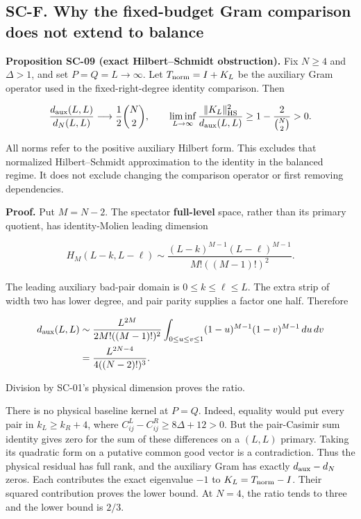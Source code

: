 \hypertarget{sc-f.-why-the-fixed-budget-gram-comparison-does-not-extend-to-balance}{%
\subsection{SC-F. Why the fixed-budget Gram comparison does not extend to balance}\label{sc-f.-why-the-fixed-budget-gram-comparison-does-not-extend-to-balance}}

\textbf{Proposition SC-09 (exact Hilbert--Schmidt obstruction).} Fix \(N\geq4\) and \(\Delta>1\), and set \(P=Q=L\to\infty\). Let \(T_{\rm norm}=I+K_L\) be the auxiliary Gram operator used in the fixed-right-degree identity comparison. Then

\[
\frac{d_{\rm aux}(L,L)}{d_N(L,L)}
\longrightarrow\frac12\binom N2,
\qquad
\liminf_{L\to\infty}
\frac{\|K_L\|_{\rm HS}^2}{d_{\rm aux}(L,L)}
\geq1-\frac{2}{\binom N2}>0.
\]

All norms refer to the positive auxiliary Hilbert form. This excludes that normalized Hilbert--Schmidt approximation to the identity in the balanced regime. It does not exclude changing the comparison operator or first removing dependencies.

\textbf{Proof.} Put \(M=N-2\). The spectator \textbf{full-level} space, rather than its primary quotient, has identity-Molien leading dimension

\[
H_M(L-k,L-\ell)\sim
\frac{(L-k)^{M-1}(L-\ell)^{M-1}}{M!((M-1)!)^2}.
\]

The leading auxiliary bad-pair domain is \(0\leq k\leq\ell\leq L\). The extra strip of width two has lower degree, and pair parity supplies a factor one half. Therefore

\[
\begin{aligned}
d_{\rm aux}(L,L)
&\sim\frac{L^{2M}}{2M!((M-1)!)^2}
\int_{0\leq u\leq v\leq1}(1-u)^{M-1}(1-v)^{M-1}\,du\,dv\\
&=\frac{L^{2N-4}}{4((N-2)!)^3}.
\end{aligned}
\]

Division by SC-01's physical dimension proves the ratio.

There is no physical baseline kernel at \(P=Q\). Indeed, equality would put every pair in \(k_L\geq k_R+4\), where \(C_{ij}^L-C_{ij}^R\geq8\Delta+12>0\). But the pair-Casimir sum identity gives zero for the sum of these differences on a \((L,L)\) primary. Taking its quadratic form on a putative common good vector is a contradiction. Thus the physical residual has full rank, and the auxiliary Gram has exactly \(d_{\rm aux}-d_N\) zeros. Each contributes the exact eigenvalue \(-1\) to \(K_L=T_{\rm norm}-I\). Their squared contribution proves the lower bound. At \(N=4\), the ratio tends to three and the lower bound is \(2/3\).

